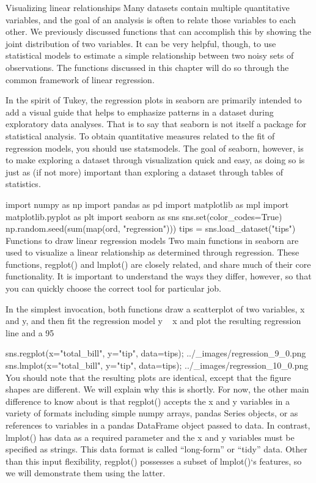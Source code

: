 Visualizing linear relationships
Many datasets contain multiple quantitative variables, and the goal of an analysis is often to relate those variables to each other. We previously discussed functions that can accomplish this by showing the joint distribution of two variables. It can be very helpful, though, to use statistical models to estimate a simple relationship between two noisy sets of observations. The functions discussed in this chapter will do so through the common framework of linear regression.

In the spirit of Tukey, the regression plots in seaborn are primarily intended to add a visual guide that helps to emphasize patterns in a dataset during exploratory data analyses. That is to say that seaborn is not itself a package for statistical analysis. To obtain quantitative measures related to the fit of regression models, you should use statsmodels. The goal of seaborn, however, is to make exploring a dataset through visualization quick and easy, as doing so is just as (if not more) important than exploring a dataset through tables of statistics.

import numpy as np
import pandas as pd
import matplotlib as mpl
import matplotlib.pyplot as plt
import seaborn as sns
sns.set(color_codes=True)
np.random.seed(sum(map(ord, "regression")))
tips = sns.load_dataset("tips")
Functions to draw linear regression models
Two main functions in seaborn are used to visualize a linear relationship as determined through regression. These functions, regplot() and lmplot() are closely related, and share much of their core functionality. It is important to understand the ways they differ, however, so that you can quickly choose the correct tool for particular job.

In the simplest invocation, both functions draw a scatterplot of two variables, x and y, and then fit the regression model y ~ x and plot the resulting regression line and a 95%

sns.regplot(x="total_bill", y="tip", data=tips);
../_images/regression_9_0.png
sns.lmplot(x="total_bill", y="tip", data=tips);
../_images/regression_10_0.png
You should note that the resulting plots are identical, except that the figure shapes are different. We will explain why this is shortly. For now, the other main difference to know about is that regplot() accepts the x and y variables in a variety of formats including simple numpy arrays, pandas Series objects, or as references to variables in a pandas DataFrame object passed to data. In contrast, lmplot() has data as a required parameter and the x and y variables must be specified as strings. This data format is called “long-form” or “tidy” data. Other than this input flexibility, regplot() possesses a subset of lmplot()‘s features, so we will demonstrate them using the latter.

